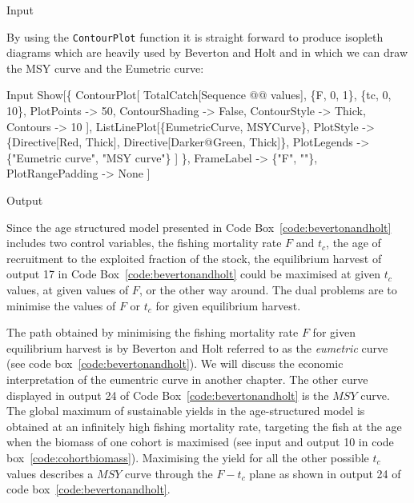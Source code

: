 \documentclass[11pt,fleqn]{book} %
\begin{document}
\begin{theorem}
\begin{mmaCell}{Input}
\end{mmaCell}
By using the \texttt{ContourPlot} function it is straight forward to produce isopleth diagrams which are heavily used by Beverton and Holt\cite{Beverton1957} and in which we can draw the MSY curve and the Eumetric curve:
\begin{mmaCell}{Input}
  Show[\{
    ContourPlot[
      TotalCatch[Sequence @@ values],
        \{F, 0, 1\}, \{tc, 0, 10\},
        PlotPoints     -> 50, 
        ContourShading -> False, 
        ContourStyle   -> Thick,
        Contours       -> 10
      ],
      ListLinePlot[\{EumetricCurve, MSYCurve\}, 
        PlotStyle   -> \{Directive[Red, Thick], 
          Directive[Darker@Green, Thick]\},  
        PlotLegends -> \{"Eumetric curve", "MSY curve"\}
      ]
    \},
    FrameLabel       -> \{"F", ""\}, 
    PlotRangePadding -> None
  ]
\end{mmaCell}
\begin{mmaCell}[moregraphics={moreig={scale=.8}}]{Output}
\end{mmaCell}
\label{code:bevertonandholt}
\end{theorem}
\hfill \break
Since the age structured model presented in Code Box~\ref{code:bevertonandholt} includes two control variables, the fishing mortality rate $F$ and $t_c$, the age of recruitment to the exploited fraction of the stock, the equilibrium harvest of output 17 in  Code Box~\ref{code:bevertonandholt} could be maximised at given $t_c$ values, at given values of $F$, or the other way around. The dual problems are to minimise the values of $F$ or $t_c$ for given equilibrium harvest.

The path obtained by minimising the fishing mortality rate $F$ for given equilibrium harvest is by Beverton and Holt referred to as the \textit{eumetric} curve (see code box~\ref{code:bevertonandholt})\cite{Beverton1956}. We will discuss the economic interpretation of the eumentric curve in another chapter. The other curve displayed in output 24 of Code Box~\ref{code:bevertonandholt} is the $MSY$ curve. The global maximum of sustainable yields in the age-structured model is obtained at an infinitely high fishing mortality rate, targeting the fish at the age when the biomass of one cohort is maximised (see input and output 10 in code box~\ref{code:cohortbiomass}). Maximising the yield for all the other possible $t_c$ values describes a $MSY$ curve through the $F-t_c$ plane as shown in output 24 of code box~\ref{code:bevertonandholt}.
\end{document}
